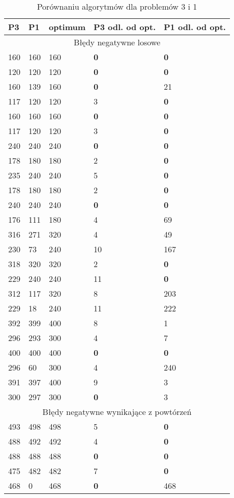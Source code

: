 \documentclass[a4paper]{article}
\begin{document}
\begin{itemize}
\begin{table}[H]
\caption{Porównaniu algorytmów dla problemów 3 i 1}
\begin{tabular}{|p{2cm}|p{2cm}|p{2cm}|p{2cm}|p{2cm}|}
\hline
\multicolumn{1}{|l|}{P3} & \multicolumn{1}{l|}{P1} &
\multicolumn{1}{l|}{optimum} & \multicolumn{1}{l|}{P3 odl. od opt.} &
\multicolumn{1}{l|}{P1 odl. od opt.} \\ \hline
\multicolumn{5}{|c|}{Błędy negatywne losowe} \\ \hline
160 & 160 & 160 & \textbf{0} & \textbf{0} \\ \hline
120 & 120 & 120 & \textbf{0} & \textbf{0} \\ \hline
160 & 139 & 160 & \textbf{0} & 21 \\ \hline
117 & 120 & 120 & 3 & \textbf{0} \\ \hline
160 & 160 & 160 & \textbf{0} & \textbf{0} \\ \hline
117 & 120 & 120 & 3 & \textbf{0} \\ \hline
240 & 240 & 240 & \textbf{0} & \textbf{0} \\ \hline
178 & 180 & 180 & 2 & \textbf{0} \\ \hline
235 & 240 & 240 & 5 & \textbf{0} \\ \hline
178 & 180 & 180 & 2 & \textbf{0} \\ \hline
240 & 240 & 240 & \textbf{0} & \textbf{0} \\ \hline
176 & 111 & 180 & 4 & 69 \\ \hline
316 & 271 & 320 & 4 & 49 \\ \hline
230 & 73 & 240 & 10 & 167 \\ \hline
318 & 320 & 320 & 2 & \textbf{0} \\ \hline
229 & 240 & 240 & 11 & \textbf{0} \\ \hline
312 & 117 & 320 & 8 & 203 \\ \hline
229 & 18 & 240 & 11 & 222 \\ \hline
392 & 399 & 400 & 8 & 1 \\ \hline
296 & 293 & 300 & 4 & 7 \\ \hline
400 & 400 & 400 & \textbf{0} & \textbf{0} \\ \hline
296 & 60 & 300 & 4 & 240 \\ \hline
391 & 397 & 400 & 9 & 3 \\ \hline
300 & 297 & 300 & \textbf{0} & 3 \\ \hline
\multicolumn{5}{|c|}{Błędy negatywne wynikające z powtórzeń} \\ \hline
493 & 498 & 498 & 5 & \textbf{0} \\ \hline
488 & 492 & 492 & 4 & \textbf{0} \\ \hline
488 & 488 & 488 & \textbf{0} & \textbf{0} \\ \hline
475 & 482 & 482 & 7 & \textbf{0} \\ \hline
468 & 0 & 468 & \textbf{0} & 468 \\ \hline
\end{tabular}
\label{}
\end{table}


\end{itemize}
\end{document}
